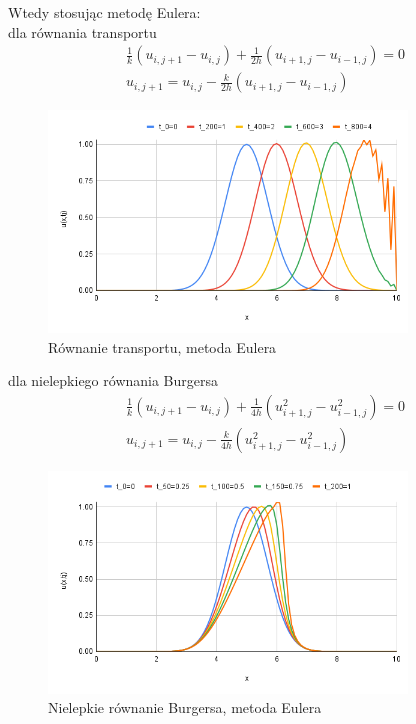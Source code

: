 \documentclass[a4paper,12pt]{article}
\begin{document}
Wtedy stosując metodę Eulera:\\
dla równania transportu
\begin{equation}
\begin{split}
& \frac{1}{k}(u_{i,j+1}-u_{i,j})+\frac{1}{2h}(u_{i+1,j}-u_{i-1,j})=0\\
& u_{i,j+1}=u_{i,j}-\frac{k}{2h}(u_{i+1,j}-u_{i-1,j})
\end{split}
\end{equation}
\begin{figure}[h]
\caption{Równanie transportu, metoda Eulera}
\centering
\includegraphics[width=0.85\textwidth]{rys/0.png}
\end{figure}
dla nielepkiego równania Burgersa
\begin{equation}
\begin{split}
& \frac{1}{k}(u_{i,j+1}-u_{i,j})+\frac{1}{4h}(u_{i+1,j}^{2}-u_{i-1,j}^{2})=0\\
& u_{i,j+1}=u_{i,j}-\frac{k}{4h}(u_{i+1,j}^{2}-u_{i-1,j}^{2})
\end{split}
\end{equation}
\begin{figure}[h]
\caption{Nielepkie równanie Burgersa, metoda Eulera}
\centering
\includegraphics[width=0.85\textwidth]{rys/1.png}
\end{figure}
\newpage
\end{document}
